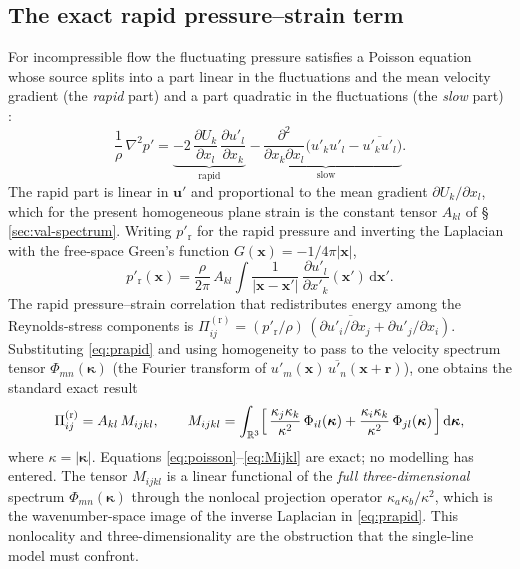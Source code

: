 \documentclass[lineno]{JFM-FLM_Au}
\begin{document}
\subsection{The exact rapid pressure--strain term}\label{sec:exact-pi}

For incompressible flow the fluctuating pressure satisfies a Poisson equation
whose source splits into a part linear in the fluctuations and the mean
velocity gradient (the \emph{rapid} part) and a part quadratic in the
fluctuations (the \emph{slow} part) \citep{Pope2000}:
\begin{equation}
  \frac{1}{\rho}\,\nabla^2 p'
  = \underbrace{-2\,\frac{\partial U_k}{\partial x_l}\,
      \frac{\partial u'_l}{\partial x_k}}_{\text{rapid}}
    \;\underbrace{-\,\frac{\partial^2}{\partial x_k\partial x_l}
      \bigl(u'_k u'_l - \overline{u'_k u'_l}\bigr)}_{\text{slow}} .
  \label{eq:poisson}
\end{equation}
The rapid part is linear in $\boldsymbol{u}'$ and proportional to the mean
gradient $\partial U_k/\partial x_l$, which for the present homogeneous plane
strain is the constant tensor $A_{kl}$ of \S\,\ref{sec:val-spectrum}. Writing
$p'_{\mathrm r}$ for the rapid pressure and inverting the Laplacian with the
free-space Green's function $G(\boldsymbol{x})=-1/4\pi|\boldsymbol{x}|$,
\begin{equation}
  p'_{\mathrm r}(\boldsymbol{x})
  = \frac{\rho}{2\pi}\,A_{kl}\!\int
    \frac{1}{|\boldsymbol{x}-\boldsymbol{x}'|}\,
    \frac{\partial u'_l}{\partial x'_k}(\boldsymbol{x}')\,
    \mathrm{d}\boldsymbol{x}' .
  \label{eq:prapid}
\end{equation}
The rapid pressure--strain correlation that redistributes energy among the
Reynolds-stress components is
$\Pi^{(\mathrm r)}_{ij}
   = \overline{(p'_{\mathrm r}/\rho)\,(\partial u'_i/\partial x_j
     + \partial u'_j/\partial x_i)}$.
Substituting \eqref{eq:prapid} and using homogeneity to pass to the
velocity spectrum tensor
$\Phi_{mn}(\boldsymbol{\kappa})$
(the Fourier transform of $\overline{u'_m(\boldsymbol{x})\,
u'_n(\boldsymbol{x}+\boldsymbol{r})}$),
one obtains the standard exact result
\citep{BatchelorProudman1954,Crow1968,HuntCarruthers1990}
\begin{equation}
  \Pi^{(\mathrm r)}_{ij}
  = A_{kl}\,M_{ijkl},
  \qquad
  M_{ijkl}
  = \int_{\mathbb{R}^3}
    \Bigl[\,
      \frac{\kappa_j\kappa_k}{\kappa^2}\,\Phi_{il}(\boldsymbol{\kappa})
      + \frac{\kappa_i\kappa_k}{\kappa^2}\,\Phi_{jl}(\boldsymbol{\kappa})
    \,\Bigr]\,\mathrm{d}\boldsymbol{\kappa},
  \label{eq:Mijkl}
\end{equation}
where $\kappa=|\boldsymbol{\kappa}|$. Equations
\eqref{eq:poisson}--\eqref{eq:Mijkl} are exact; no modelling has entered. The
tensor $M_{ijkl}$ is a linear functional of the \emph{full three-dimensional}
spectrum $\Phi_{mn}(\boldsymbol{\kappa})$ through the nonlocal projection
operator $\kappa_a\kappa_b/\kappa^2$, which is the wavenumber-space image of
the inverse Laplacian in \eqref{eq:prapid}. This nonlocality and
three-dimensionality are the obstruction that the single-line model must
confront.
\end{document}
